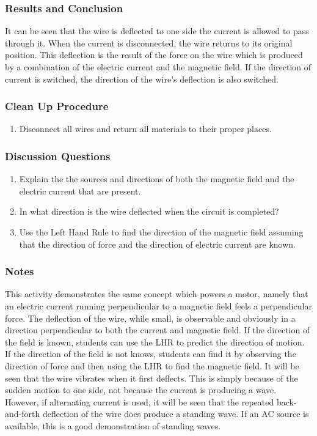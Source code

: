 \subsubsection*{Results and Conclusion}
It can be seen that the wire is deflected to one side the current is allowed to pass through it. When the current is disconnected, the wire returns to its original position. This deflection is the result of the force on the wire which is produced by a combination of the electric current and the magnetic field.  
If the direction of current is switched, the direction of the wire's deflection is also switched.  

\subsubsection*{Clean Up Procedure}
\begin{enumerate}
\item{Disconnect all wires and return all materials to their proper places.} 
\end{enumerate}

\subsubsection*{Discussion Questions}
\begin{enumerate}
\item{Explain the the sources and directions of both the magnetic field and the electric current that are present.} 
\item{In what direction is the wire deflected when the circuit is completed?}
\item{Use the Left Hand Rule to find the direction of the magnetic field assuming that the direction of force and the direction of electric current are known.} 
\end{enumerate}

\subsubsection*{Notes}
This activity demonstrates the same concept which powers a motor, namely that an electric current running perpendicular to a magnetic field feels a perpendicular force. The deflection of the wire, while small, is observable and obviously in a direction perpendicular to both the current and magnetic field.  
If the direction of the field is known, students can use the LHR to predict the direction of motion. If the direction of the field is not knows, students can find it by observing the direction of force and then using the LHR to find the magnetic field.  
It will be seen that the wire vibrates when it first deflects. This is simply because of the sudden motion to one side, not because the current is producing a wave. However, if alternating current is used, it will be seen that the repeated back-and-forth deflection of the wire does produce a standing wave. If an AC source is available, this is a good demonstration of standing waves.  

